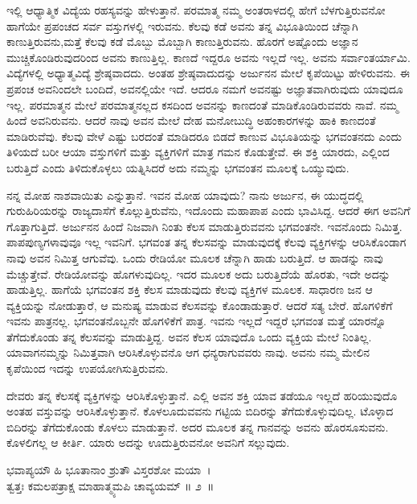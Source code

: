 ಇಲ್ಲಿ ಆಧ್ಯಾತ್ಮಿಕ ವಿದ್ಯೆಯ ರಹಸ್ಯವನ್ನು ಹೇಳುತ್ತಾನೆ. ಪರಮಾತ್ಮ ನಮ್ಮ ಅಂತರಾಳದಲ್ಲಿ ಹೇಗೆ ಬೆಳಗುತ್ತಿರುವನೋ ಹಾಗೆಯೇ ಪ್ರಪಂಚದ ಸರ್ವ ವಸ್ತುಗಳಲ್ಲಿ ಇರುವನು. ಕೆಲವು ಕಡೆ ಅವನು ತನ್ನ ವಿಭೂತಿಯಿಂದ ಚೆನ್ನಾಗಿ ಕಾಣುತ್ತಿರುವನು,ಮತ್ತೆ ಕೆಲವು ಕಡೆ ಮೊಬ್ಬು ಮೊಬ್ಬಾಗಿ ಕಾಣುತ್ತಿರುವನು. ಹೊರಗೆ ಅಷ್ಟೊಂದು ಅಜ್ಞಾನ ಮುಚ್ಚಿಕೊಂಡಿರುವುದರಿಂದ ಅವನು ಕಾಣುತ್ತಿಲ್ಲ. ಕಾಣದೆ ಇದ್ದರೂ ಅವನು ಇಲ್ಲದೆ ಇಲ್ಲ. ಅವನು ಸರ್ವಾಂತರ್ಯಾಮಿ. ವಿದ್ಯೆಗಳಲ್ಲಿ ಅಧ್ಯಾತ್ಮವಿದ್ಯೆ ಶ್ರೇಷ್ಠವಾದದು. ಅಂತಹ ಶ್ರೇಷ್ಠವಾದುದನ್ನು ಅರ್ಜುನನ ಮೇಲೆ ಕೃಪೆಯಿಟ್ಟು ಹೇಳಿರುವನು. ಈ ಪ್ರಪಂಚ ಅವನಿಂದಲೇ ಬಂದಿದೆ, ಅವನಲ್ಲಿಯೇ ಇದೆ. ಆದರೂ ನಮಗೆ ಅವನಷ್ಟು ಅಜ್ಞಾತವಾಗಿರುವುದು ಯಾವುದೂ ಇಲ್ಲ. ಪರಮಾತ್ಮನ ಮೇಲೆ ಪರಮಾತ್ಮನಲ್ಲದ ಕಸದಿಂದ ಅವನನ್ನು ಕಾಣದಂತೆ ಮಾಡಿಕೊಂಡಿರುವವರು ನಾವೆ. ನಮ್ಮ ಹಿಂದೆ ಅವನಿರುವನು. ಆದರೆ ನಾವು ಅವನ ಮೇಲೆ ದೇಹ ಮನೋಬುದ್ಧಿ ಅಹಂಕಾರಗಳನ್ನು ಹಾಕಿ ಕಾಣದಂತೆ ಮಾಡಿರುವೆವು. ಕೆಲವು ವೇಳೆ ಎಷ್ಟು ಬರದಂತೆ ಮಾಡಿದರೂ ಬಿಡದೆ ಕಾಣುವ ವಿಭೂತಿಯನ್ನು ಭಗವಂತನದು ಎಂದು ತಿಳಿಯದೆ ಬರೀ ಆಯಾ ವಸ್ತುಗಳಿಗೆ ಮತ್ತು ವ್ಯಕ್ತಿಗಳಿಗೆ ಮಾತ್ರ ಗಮನ ಕೊಡುತ್ತೇವೆ. ಈ ಶಕ್ತಿ ಯಾರದು, ಎಲ್ಲಿಂದ ಬರುತ್ತಿದೆ ಎಂದು ತಿಳಿದುಕೊಳ್ಳಲು ಯತ್ನಿಸಿದರೆ ಅದು ನಮ್ಮನ್ನು ಭಗವಂತನ ಮೂಲಕ್ಕೆ ಒಯ್ಯುವುದು.

ನನ್ನ ಮೋಹ ನಾಶವಾಯಿತು ಎನ್ನುತ್ತಾನೆ. ಇವನ ಮೋಹ ಯಾವುದು? ನಾನು ಅರ್ಜುನ, ಈ ಯುದ್ಧದಲ್ಲಿ ಗುರುಹಿರಿಯರನ್ನು ರಾಜ್ಯದಾಸೆಗೆ ಕೊಲ್ಲುತ್ತಿರುವೆನು, ಇದೊಂದು ಮಹಾಪಾಪ ಎಂದು ಭಾವಿಸಿದ್ದ. ಆದರೆ ಈಗ ಅವನಿಗೆ ಗೊತ್ತಾಗುತ್ತಿದೆ. ಅರ್ಜುನನ ಹಿಂದೆ ನಿಜವಾಗಿ ನಿಂತು ಕೆಲಸ ಮಾಡುತ್ತಿರುವವನು ಭಗವಂತನೇ. ಇವನೊಂದು ನಿಮಿತ್ತ. ಪಾಪಪುಣ್ಯಗಳಾವುವೂ ಇಲ್ಲ ಇವನಿಗೆ. ಭಗವಂತ ತನ್ನ ಕೆಲಸವನ್ನು ಮಾಡುವುದಕ್ಕೆ ಕೆಲವು ವ್ಯಕ್ತಿಗಳನ್ನು ಆರಿಸಿಕೊಂಡಾಗ ನಾವು ಅವನ ನಿಮಿತ್ತ ಆಗುವೆವು. ಒಂದು ರೇಡಿಯೋ ಮೂಲಕ ಚೆನ್ನಾಗಿ ಹಾಡು ಬರುತ್ತಿದೆ. ಆ ಹಾಡನ್ನು ನಾವು ಮೆಚ್ಚುತ್ತೇವೆ. ರೇಡಿಯೋವನ್ನು ಹೊಗಳುವುದಿಲ್ಲ. ಇದರ ಮೂಲಕ ಅದು ಬರುತ್ತಿದೆಯೆ ಹೊರತು, ಇದೇ ಅದನ್ನು ಹಾಡುತ್ತಿಲ್ಲ. ಹಾಗೆಯೆ ಭಗವಂತನ ಶಕ್ತಿ ಕೆಲಸ ಮಾಡುವುದು ಕೆಲವು ವ್ಯಕ್ತಿಗಳ ಮೂಲಕ. ಸಾಧಾರಣ ಜನ ಆ ವ್ಯಕ್ತಿಯನ್ನು ನೋಡುತ್ತಾರೆ, ಆ ಮನುಷ್ಯ ಮಾಡುವ ಕೆಲಸವನ್ನು ಕೊಂಡಾಡುತ್ತಾರೆ. ಆದರೆ ಸತ್ಯ ಬೇರೆ. ಹೊಗಳಿಕೆಗೆ ಇವನು ಪಾತ್ರನಲ್ಲ. ಭಗವಂತನೊಬ್ಬನೇ ಹೊಗಳಿಕೆಗೆ ಪಾತ್ರ. ಇವನು ಇಲ್ಲದೆ ಇದ್ದರೆ ಭಗವಂತ ಮತ್ತೆ ಯಾರನ್ನೊ ತೆಗೆದುಕೊಂಡು ತನ್ನ ಕೆಲಸವನ್ನು ಮಾಡುತ್ತಿದ್ದ. ಅವನ ಕೆಲಸ ಯಾವುದೊ ಒಂದು ವ್ಯಕ್ತಿಯ ಮೇಲೆ ನಿಂತಿಲ್ಲ. ಯಾವಾಗ\break ನಮ್ಮನ್ನು ನಿಮಿತ್ತವಾಗಿ ಆರಿಸಿಕೊಳ್ಳುವನೊ ಆಗ ಧನ್ಯರಾಗುವವರು ನಾವು. ಅವನು ನಮ್ಮ ಮೇಲಿನ ಕೃಪೆಯಿಂದ ಇದನ್ನು ಉಪಯೋಗಿಸುತ್ತಿರುವನು.

ದೇವರು ತನ್ನ ಕೆಲಸಕ್ಕೆ ವ್ಯಕ್ತಿಗಳನ್ನು ಆರಿಸಿಕೊಳ್ಳುತ್ತಾನೆ. ಎಲ್ಲಿ ಅವನ ಶಕ್ತಿ ಯಾವ ತಡೆಯೂ ಇಲ್ಲದೆ ಹರಿಯುವುದೊ ಅಂತಹ ವಸ್ತುವನ್ನು ಆರಿಸಿಕೊಳ್ಳುತ್ತಾನೆ. ಕೊಳಲೂದುವವನು ಗಟ್ಟಿಯ ಬಿದಿರನ್ನು ತೆಗೆದುಕೊಳ್ಳುವುದಿಲ್ಲ. ಟೊಳ್ಳಾದ ಬಿದಿರನ್ನು ತೆಗೆದುಕೊಂಡು ಕೊಳಲು ಮಾಡುತ್ತಾನೆ. ಅದರ ಮೂಲಕ ತನ್ನ ಗಾನವನ್ನು ಅವನು ಹೊರಸೂಸುವನು. ಕೊಳಲಿಗಲ್ಲ ಆ ಕೀರ್ತಿ. ಯಾರು ಅದನ್ನು ಊದುತ್ತಿರುವನೋ ಅವನಿಗೆ ಸಲ್ಲುವುದು.

\begin{shloka}
ಭವಾಪ್ಯಯೌ ಹಿ ಭೂತಾನಾಂ ಶ್ರುತೌ ವಿಸ್ತರಶೋ ಮಯಾ~।\\ತ್ವತ್ತಃ ಕಮಲಪತ್ರಾಕ್ಷ ಮಾಹಾತ್ಮ್ಯಮಪಿ ಚಾವ್ಯಯಮ್ \hfill॥ ೨~॥
\end{shloka}

